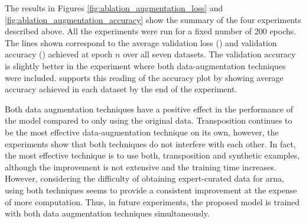 
The results in Figures \ref{fig:ablation_augmentation_loss}
and \ref{fig:ablation_augmentation_accuracy} show the
summary of the four experiments described above. All the
experiments were run for a fixed number of 200 epochs. The
lines shown correspond to the average validation loss
() and validation
accuracy () achieved
at epoch $n$ over all seven datasets. The validation
accuracy is slightly better in the experiment where both
data-augmentation techniques were included.
 supports this reading of the
accuracy plot by showing average accuracy achieved in each
dataset by the end of the experiment.




Both data augmentation techniques have a positive effect in
the performance of the model compared to only using the
original data. Transposition continues to be the most
effective data-augmentation technique on its own, however,
the experiments show that both techniques do not interfere
with each other. In fact, the most effective technique is to
use both, transposition and synthetic examples, although the
improvement is not extensive and the training time
increases. However, considering the difficulty of obtaining
expert-curated data for \gls{arna}, using both techniques
seems to provide a consistent improvement at the expense of
more computation. Thus, in future experiments, the proposed
model is trained with both data augmentation techniques
simultaneously.
